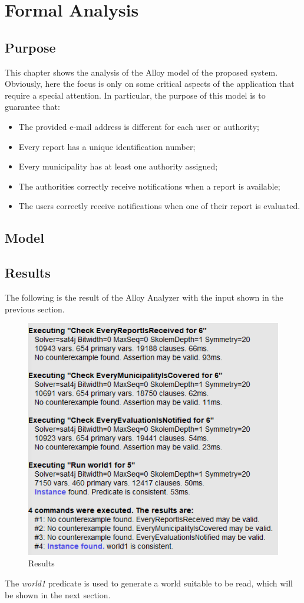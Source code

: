 \documentclass[12pt,a4paper]{report}
\begin{document}
\chapter{Formal Analysis}
	\section{Purpose}
This chapter shows the analysis of the Alloy model of the proposed system. Obviously, here the focus is only on some critical aspects of the application that require a special attention. In particular, the purpose of this model is to guarantee that:
\begin{itemize}
	\item The provided e-mail address is different for each user or authority;
	\item Every report has a unique identification number;
	\item Every municipality has at least one authority assigned;
	\item The authorities correctly receive notifications when a report is available;
	\item The users correctly receive notifications when one of their report is evaluated.
\end{itemize}

\newpage
	\section{Model}

	

	\newpage

	\section{Results}
	The following is the result of the Alloy Analyzer with the input shown in the previous section. 
		\begin{figure}[H]
				\includegraphics[scale = 0.9, center]{Consistency}
				\caption{Results}
		\end{figure}
	The \emph{world1} predicate is used to generate a world suitable to be read, which will be shown in the next section.
	
\end{document}
